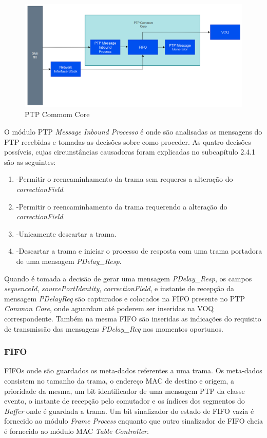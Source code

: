 \begin{figure}[H]
  \centering
  \includegraphics[width=1 \textwidth]{CommomCore.png}
  \caption[PTP Commom Core]{PTP Commom Core}
  \label{fig:airbus1}
\end{figure} 

O módulo PTP \textit{Message Inbound Processo} é onde são analisadas as mensagens do PTP recebidas e tomadas as decisões sobre como proceder. As quatro decisões possíveis, cujas circunstâncias causadoras foram explicadas no subcapítulo 2.4.1 são as seguintes:

\begin{enumerate}
    \item -\quad Permitir o reencaminhamento da trama sem requeres a alteração do \textit{correctionField}.
    \item -\quad Permitir o reencaminhamento da trama requerendo a alteração do \textit{correctionField}.
    \item -\quad Unicamente descartar a trama.
    \item -\quad Descartar a trama e iniciar o processo de resposta com uma trama portadora de uma mensagem \textit{PDelay\_Resp}.
\end{enumerate}

Quando é tomada a decisão de gerar uma mensagem \textit{PDelay\_Resp}, os campos \textit{sequenceId}, \textit{sourcePortIdentity}, \textit{correctionField}, e instante de recepção da mensagem \textit{PDelayReq} são capturados e colocados na FIFO presente no PTP \textit{Common Core}, onde aguardam até poderem ser inseridas na VOQ correspondente. Também na mesma FIFO são inseridas as indicações do requisito de transmissão das mensagens \textit{PDelay\_Req} nos momentos oportunos. 
 

\subsubsection{FIFO}
FIFOs onde são guardados os meta-dados referentes a uma trama. Os meta-dados consistem no tamanho da trama, o endereço MAC de destino e origem, a prioridade da mesma, um bit identificador de uma mensagem PTP da classe evento, o instante de recepção pelo comutador e os índices dos segmentos do \textit{Buffer} onde é guardada a trama. Um bit sinalizador do estado de FIFO vazia é fornecido ao módulo \textit{Frame Process} enquanto que outro sinalizador de FIFO cheia é fornecido ao módulo MAC \textit{Table Controller}. 



